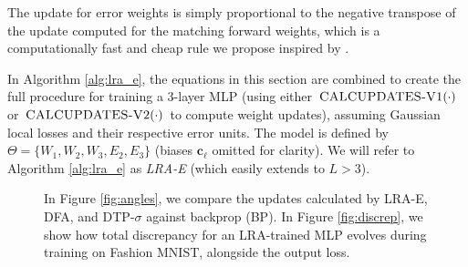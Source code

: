 \documentclass[letterpaper]{article} %
\begin{document}
The update for error weights is simply proportional to the negative transpose of the update computed for the matching forward weights, which is a computationally fast and cheap rule we propose inspired by \cite{rao1997dynamic}.

In Algorithm \ref{alg:lra_e}, the equations in this section are combined to create the full procedure for training a 3-layer MLP (using either $\Call{CALCUPDATES-V1}{\cdot}$ or $\Call{CALCUPDATES-V2}{\cdot}$ to compute weight updates), assuming Gaussian local losses and their respective error units. The model is defined by $\Theta = \{ W_1, W_2, W_3, E_2, E_3\}$ (biases $\mathbf{c}_\ell$ omitted for clarity). We will refer to Algorithm \ref{alg:lra_e} as \emph{LRA-E} (which easily extends to $L > 3$).

\begin{figure}
\centering     %
{}
\hspace{0.15cm}
\caption{In Figure \ref{fig:angles}, we compare the updates calculated by LRA-E, DFA, and DTP-$\sigma$ against backprop (BP). In Figure \ref{fig:discrep}, we show how total discrepancy for an LRA-trained MLP evolves during training on Fashion MNIST, alongside the output loss.}
\label{fig:lra_algos}
\end{figure}
\end{document}
